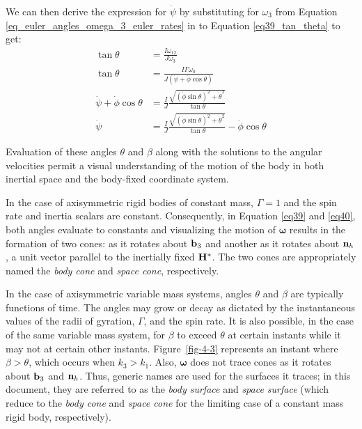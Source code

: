 We can then derive the expression for $\dot{\psi}$ by substituting for $\omega_3$ from Equation \eqref{eq_euler_angles_omega_3_euler_rates} in to Equation \eqref{eq39_tan_theta} to get:
\begin{align}
\tan \theta &= \frac{I \omega_{12}}{J \omega_3}\\
\tan{\theta} &= \frac{I \Gamma \omega_{0}}{J (\dot{\psi} + \dot{\phi} \cos \theta)}\\
\dot{\psi} + \dot{\phi} \cos \theta &= \frac{I}{J} \frac{\sqrt{(\dot{\phi} \sin \theta)^2 + \dot{\theta}^2}}{\tan \theta}\\
\dot{\psi} &= \frac{I}{J} \frac{\sqrt{(\dot{\phi} \sin \theta)^2 + \dot{\theta}^2}}{\tan \theta} - \dot{\phi} \cos \theta
\end{align}

Evaluation of these angles $\theta$ and $\beta$ along with the solutions to the angular velocities permit a visual understanding of the motion of the body in both inertial space and the body-fixed coordinate system.

In the case of axisymmetric rigid bodies of constant mass, $\Gamma = 1$ and the spin rate and inertia scalars are constant. Consequently, in Equation \eqref{eq39} and \eqref{eq40}, both angles evaluate to constants and visualizing the motion of $\boldsymbol{\omega}$ results in the formation of two cones: as it rotates about ${\bf b}_3$ and another as it rotates about ${\bf n}_h$, a unit vector parallel to the inertially fixed ${\bf H}^*$. The two cones are appropriately named the \textit{body cone} and \textit{space cone}, respectively.

In the case of axisymmetric variable mass systems, angles $\theta$ and $\beta$ are typically functions of time. The angles may grow or decay as dictated by the instantaneous values of the radii of gyration, $\Gamma$, and the spin rate. It is also possible, in the case of the same variable mass system, for $\beta$ to exceed $\theta$ at certain instants while it may not at certain other instants. Figure~\ref{fig-4-3} represents an instant where $\beta>\theta$, which occurs when $k_3>k_1$. Also, $\boldsymbol{\omega}$ does not trace cones as it rotates about ${\bf b}_3$ and ${\bf n}_h$. Thus, generic names are used for the surfaces it traces; in this document, they are referred to as the \textit{body surface} and \textit{space surface} (which reduce to the \textit{body cone} and \textit{space cone} for the limiting case of a constant mass rigid body, respectively).

